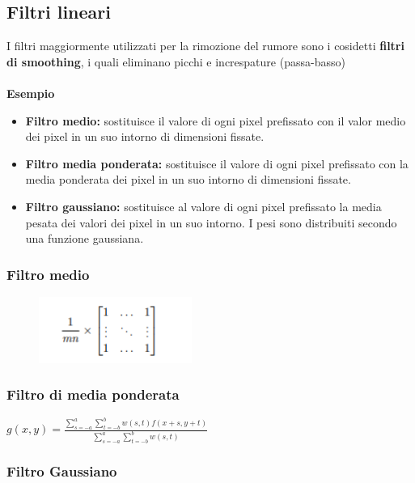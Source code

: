 \subsection{Filtri lineari}

I filtri maggiormente utilizzati per la rimozione del rumore sono i cosidetti \textbf{filtri di smoothing}, i quali eliminano picchi e increspature (passa-basso)
\\\\
\textbf{Esempio}

\begin{itemize}
    \item \textbf{Filtro medio:} sostituisce il valore di ogni pixel prefissato con il
          valor medio dei pixel in un suo intorno di dimensioni fissate.
    \item \textbf{Filtro media ponderata:} sostituisce il valore di ogni pixel prefissato con la media ponderata dei pixel in un suo
          intorno di dimensioni fissate.
    \item \textbf{Filtro gaussiano:} sostituisce al valore di ogni pixel prefissato la
          media pesata dei valori dei pixel in un suo intorno. I pesi sono distribuiti secondo una funzione gaussiana.
\end{itemize}

\subsubsection{Filtro medio}

\begin{figure}[H]
    \centering
    \includegraphics[width=5cm, keepaspectratio]{capitoli/immagini/imgs/filtro-medio.png}
\end{figure}

\subsubsection{Filtro di media ponderata}

\begin{center}
    $g(x,y)=\frac{\sum_{s=-a}^{a}\sum_{t=-b}^{b}w(s,t)f(x+s,y+t)}{\sum_{s=-a}^{a}\sum_{t=-b}^{b}w(s,t)}$
\end{center}

\subsubsection{Filtro Gaussiano}

